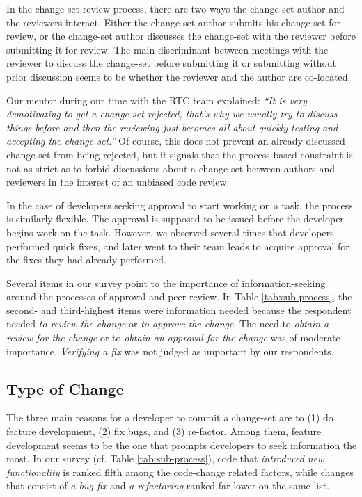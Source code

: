 In the change-set review process, there are two ways the change-set author and the reviewers interact.
Either the change-set author submits his change-set for review, or the change-set author discusses the change-set with the reviewer before submitting it for review. The main discriminant between meetings with the reviewer to discuss the change-set before submitting it or submitting without prior discussion seems to be whether the reviewer and the author are co-located.

Our mentor during our time with the RTC team explained: \emph{``It is very demotivating to get a change-set rejected, that's why we usually try to discuss things before and then the reviewing just becomes all about quickly testing and accepting the change-set.''} Of course, this does not prevent an already discussed change-set from being rejected, but it signals that the process-based constraint is not as strict as to forbid discussions about a change-set between authors and reviewers in the interest of an unbiased code review.

In the case of developers seeking approval to start working on a task, the process is similarly flexible. The approval is supposed to be issued before the developer begins work on the task. However, we observed several times that developers performed quick fixes, and later went to their team leads to acquire approval for the fixes they had already performed.

Several items in our survey point to the importance of information-seeking around the processes of approval and peer review. In Table \ref{tab:sub-process}, the second- and third-highest items were information needed because the respondent needed \emph{to review the change} or \emph{to approve the change}. The need to  \emph{obtain a review for the change} or to \emph{obtain an approval for the change} was of moderate importance. \emph{Verifying a fix} was not judged as important by our respondents.

\subsection{Type of Change}
The three main reasons for a developer to commit a change-set are to (1) do feature development, (2) fix bugs, and (3) re-factor. Among them, feature development seems to be the one that prompts developers to seek information the most.
In our survey (cf. Table \ref{tab:sub-process}), code that \emph{introduced new functionality} is ranked fifth among the code-change related factors, while changes that consist of \emph{a bug fix} and \emph{a refactoring} ranked far lower on the same list.

